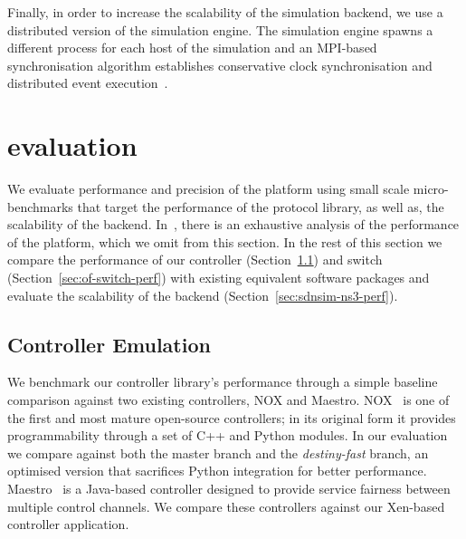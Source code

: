 Finally, in order to increase the scalability of the \sdnsim simulation backend,
we use a distributed version of the  simulation engine. The simulation
engine spawns a different process for each host of the simulation and an
MPI-based synchronisation algorithm establishes conservative clock
synchronisation and distributed event execution~\cite{Pelkey:2011ua}. 

\section{\sdnsim evaluation} \label{sec:sdnsim-precision}

We evaluate performance and precision of the \sdnsim platform using small scale
micro-benchmarks that target the performance of the \of protocol library, as
well as, the scalability of the  backend.  In~\cite{madhavapeddy2013},
there is an exhaustive analysis of the performance of the \mirage platform,
which we omit from this section. In the rest of this section we compare the
performance of our \mirage \of controller (Section~\ref{sec:of-controller-perf})
and \mirage \of switch (Section~\ref{sec:of-switch-perf}) with existing
equivalent software packages and evaluate the scalability of the  backend
(Section~\ref{sec:sdnsim-ns3-perf}).

\subsection{\mirage Controller Emulation} \label{sec:of-controller-perf}

We benchmark our controller library's performance through a simple baseline
comparison against two existing \of controllers, NOX and Maestro.
NOX~\cite{nox} is one of the first and most mature open-source \of controllers;
in its original form it provides programmability through a set of C++ and Python
modules.  In our evaluation we compare against both the master branch and the
{\it destiny-fast} \/branch, an optimised version that sacrifices Python
integration for better performance.  Maestro~\cite{cai2011} is a Java-based
controller designed to provide service fairness between multiple \of control
channels.  We compare these controllers against our Xen-based \mirage \of
controller application.

